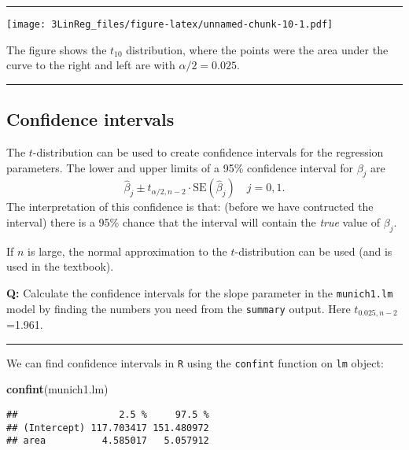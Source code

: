 \documentclass[]{article}
\newenvironment{Shaded}{\begin{snugshade}}{\end{snugshade}}
\newcommand{\KeywordTok}[1]{\textcolor[rgb]{0.13,0.29,0.53}{\textbf{#1}}}
\newcommand{\NormalTok}[1]{#1}
\begin{document}
\begin{center}\rule{0.5\linewidth}{\linethickness}\end{center}

\texttt{[image: 3LinReg\_files/figure-latex/unnamed-chunk-10-1.pdf]}

The figure shows the \(t_{10}\) distribution, where the points were the
area under the curve to the right and left are with \(\alpha/2=0.025\).

\begin{center}\rule{0.5\linewidth}{\linethickness}\end{center}

\hypertarget{confidence-intervals}{%
\subsection{Confidence intervals}\label{confidence-intervals}}

The \(t\)-distribution can be used to create confidence intervals for
the regression parameters. The lower and upper limits of a 95\%
confidence interval for \(\beta_j\) are
\[\hat{\beta}_j \pm t_{\alpha/2,n-2} \cdot\text{SE} (\hat{\beta}_j) \quad j=0, 1.\]
The interpretation of this confidence is that: (before we have
contructed the interval) there is a 95\% chance that the interval will
contain the \emph{true} value of \(\beta_j\).

If \(n\) is large, the normal approximation to the \(t\)-distribution
can be used (and is used in the textbook).

\textbf{Q:} Calculate the confidence intervals for the slope parameter
in the \texttt{munich1.lm} model by finding the numbers you need from
the \texttt{summary} output. Here \(t_{0.025,n-2}\)=1.961.

\begin{center}\rule{0.5\linewidth}{\linethickness}\end{center}

We can find confidence intervals in \texttt{R} using the
\texttt{confint} function on \texttt{lm} object:

\begin{Shaded}
\begin{Highlighting}[]
\KeywordTok{confint}\NormalTok{(munich1.lm)}
\end{Highlighting}
\end{Shaded}

\begin{verbatim}
##                  2.5 %     97.5 %
## (Intercept) 117.703417 151.480972
## area          4.585017   5.057912
\end{verbatim}
\end{document}

